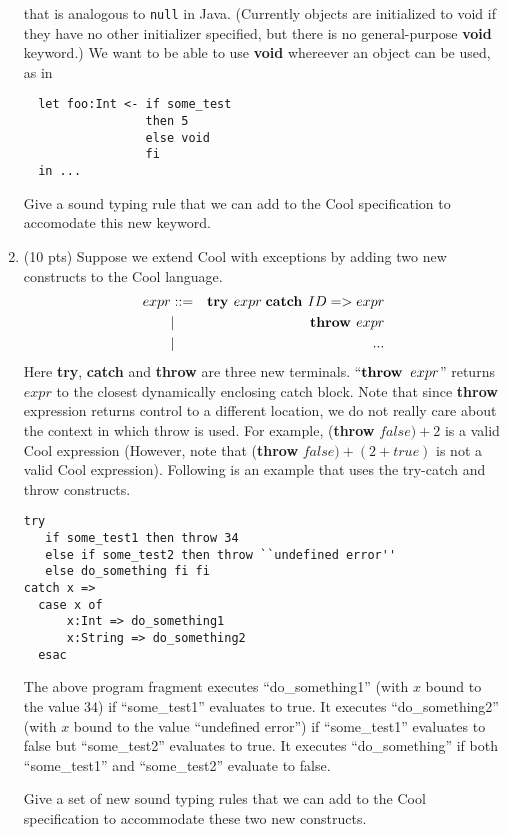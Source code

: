 \documentclass[10pt]{article}
\begin{document}
\begin{enumerate}
  that is analogous to {\tt null} in Java. (Currently objects are
  initialized to void if they have no other initializer specified, but
  there is no general-purpose {\bf void} keyword.)  We want to be able
  to use {\bf void} whereever an object can be used, as in
\begin{verbatim}
  let foo:Int <- if some_test
                 then 5
                 else void
                 fi
  in ...
\end{verbatim}

  Give a sound typing rule that we can add to the Cool specification
  to accomodate this new keyword.

\medskip
\item  (10 pts) Suppose we extend Cool with exceptions by adding two new constructs
to the Cool language.
\begin{eqnarray*}
  expr & ::= & \textit{\bf try } expr \;\textit{\bf catch } ID => expr \\
       & |   & \textit{\bf throw } expr \\
       & | & ...
\end{eqnarray*}
Here {\bf try}, {\bf catch} and {\bf throw} are three new terminals.
  ``${\bf throw }\;\; expr$'' returns $expr$ to the
  closest dynamically enclosing catch block.
Note that since {\bf throw} expression returns control to a different location, we do not really
  care about the context in which throw is used. For example,
({\bf throw} $false) + 2$ is a valid Cool expression (However, note that
  ({\bf throw} $false) + (2+true)$ is not a valid Cool expression).  Following is an example that uses the
try-catch and throw constructs.
\begin{verbatim}
try
   if some_test1 then throw 34
   else if some_test2 then throw ``undefined error''
   else do_something fi fi
catch x =>
  case x of
      x:Int => do_something1
      x:String => do_something2
  esac
\end{verbatim}

The above program fragment executes
  ``do\_something1'' (with $x$ bound to the value 34) if ``some\_test1''
  evaluates to \textsf{true}. It executes ``do\_something2'' (with $x$ bound to the
  value ``undefined error'') if ``some\_test1'' evaluates to \textsf{false} but
  ``some\_test2'' evaluates to \textsf{true}. It executes ``do\_something'' if both
  ``some\_test1'' and ``some\_test2'' evaluate to \textsf{false}.


Give a set of new sound typing rules that we can add to the Cool specification
to accommodate these two new constructs.


\end{enumerate}
\end{document}
